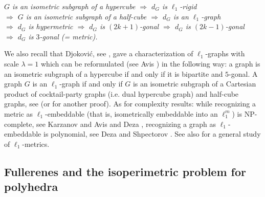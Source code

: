 \begin{center}
{\em 
$G$ is an isometric subgraph of a hypercube
$\Rightarrow$
$d_G$ is $\ell_1$-rigid\\
$\Rightarrow$
$G$ is an isometric subgraph of a half-cube
$\Rightarrow$
$d_G$ is an $\ell_1$-graph\\
$\Rightarrow$
$d_G$ is hypermetric
$\Rightarrow$
$d_G$ is $(2k+1)$-gonal 
$\Rightarrow$
$d_G$ is $(2k-1)$-gonal\\
$\Rightarrow$
$d_G$ is $3$-gonal (= metric).
}
\end{center}

We also recall that {\sc Djokovi\'c}, see \cite{d73}, gave a characterization 
of $\ell_1$-graphs with scale $\lambda=1$ which can be reformulated 
(see {\sc Avis} \cite{a80}) in the following way: a graph is an isometric 
subgraph of a hypercube if and only if it is bipartite and $5$-gonal.
A graph $G$ is an $\ell_1$-graph
if and only if $G$ is an isometric subgraph 
of a Cartesian product of cocktail-party graphs (i.e. dual hypercube graph) and half-cube graphs, see 
\cite{s93} (or \cite{dg93} for another proof).
As for complexity results: while recognizing a metric as $\ell_1$-embeddable
(that is, isometrically embeddable into an $\ell_1^m$) is 
NP-complete, see {\sc Karzanov} \cite{k85} and {\sc Avis and Deza} \cite{ad91}, recognizing a graph as 
$\ell_1$-embeddable is polynomial, 
see {\sc Deza and Shpectorov} \cite{ds96}.
See also \cite{dl96} for a general study of $\ell_1$-metrics.

\newpage
\subsection{Fullerenes and the isoperimetric problem for polyhedra}
